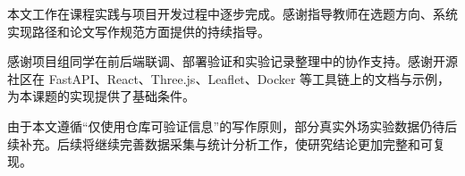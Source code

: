
\begin{thankscontent}
    本文工作在课程实践与项目开发过程中逐步完成。感谢指导教师在选题方向、系统实现路径和论文写作规范方面提供的持续指导。

    感谢项目组同学在前后端联调、部署验证和实验记录整理中的协作支持。感谢开源社区在 FastAPI、React、Three.js、Leaflet、Docker 等工具链上的文档与示例，为本课题的实现提供了基础条件。

    由于本文遵循“仅使用仓库可验证信息”的写作原则，部分真实外场实验数据仍待后续补充。后续将继续完善数据采集与统计分析工作，使研究结论更加完整和可复现。
\end{thankscontent}